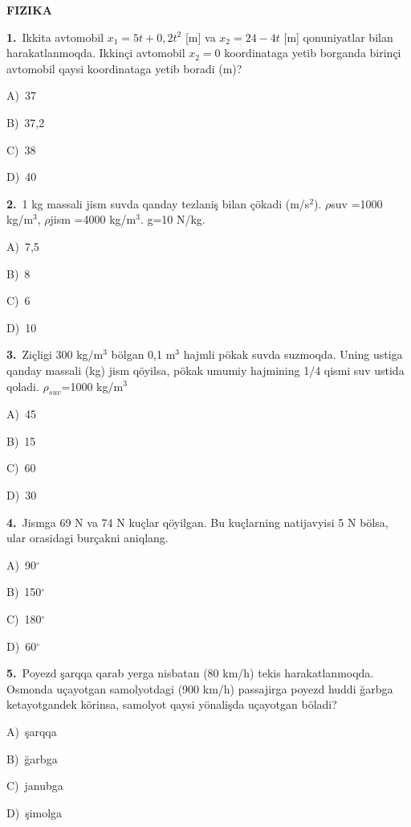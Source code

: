 \documentclass[11pt,a4paper]{article}
\newcommand{\opt}[2]{\hspace*{4mm}#1)\ #2\par}
\begin{document}
\begin{center}{\Large\textbf{FIZIKA}}\end{center}
\noindent\begin{minipage}{\linewidth}
\textbf{1.}\ Ikkita avtomobil $x_1=5t+0{,}2t^2$ [m] va $x_2=24-4t$ [m] qonuniyatlar bilan harakatlanmoqda. Ikkinçi avtomobil $x_2=0$ koordinataga yetib borganda birinçi avtomobil qaysi koordinataga yetib boradi (m)?\par\smallskip
\opt{A}{37}
\opt{B}{37,2}
\opt{C}{38}
\opt{D}{40}
\end{minipage}\vspace{9pt}\par
\noindent\begin{minipage}{\linewidth}
\textbf{2.}\ 1 kg massali jism suvda qanday tezlaniş bilan çökadi (m/s$^{2}$). $\rho$suv =1000 kg/m$^{3}$, $\rho$jism =4000 kg/m$^{3}$. g=10 N/kg.\par\smallskip
\opt{A}{7,5}
\opt{B}{8}
\opt{C}{6}
\opt{D}{10}
\end{minipage}\vspace{9pt}\par
\noindent\begin{minipage}{\linewidth}
\textbf{3.}\ Ziçligi 300 kg/m$^{3}$ bölgan 0,1 m$^{3}$ hajmli pökak suvda suzmoqda. Uning ustiga qanday massali (kg) jism qöyilsa, pökak umumiy hajmining 1/4 qismi suv ustida qoladi. $\rho_{suv}$=1000 kg/m$^{3}$\par\smallskip
\opt{A}{45}
\opt{B}{15}
\opt{C}{60}
\opt{D}{30}
\end{minipage}\vspace{9pt}\par
\noindent\begin{minipage}{\linewidth}
\textbf{4.}\ Jismga 69 N va 74 N kuçlar qöyilgan. Bu kuçlarning natijavyisi 5 N bölsa, ular orasidagi burçakni aniqlang.\par\smallskip
\opt{A}{90$^\circ$}
\opt{B}{150$^\circ$}
\opt{C}{180$^\circ$}
\opt{D}{60$^\circ$}
\end{minipage}\vspace{9pt}\par
\noindent\begin{minipage}{\linewidth}
\textbf{5.}\ Poyezd şarqqa qarab yerga nisbatan (80 km/h) tekis harakatlanmoqda. Osmonda uçayotgan samolyotdagi (900 km/h) passajirga poyezd huddi ğarbga ketayotgandek körinsa, samolyot qaysi yönalişda uçayotgan böladi?\par\smallskip
\opt{A}{şarqqa}
\opt{B}{ğarbga}
\opt{C}{janubga}
\opt{D}{şimolga}
\end{minipage}\vspace{9pt}\par
\end{document}
